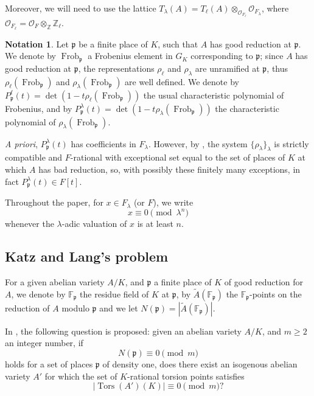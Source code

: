 \documentclass[a4paper,11pt]{amsart}
\theoremstyle{definition}
\newtheorem{notation}[definition]{Notation}
\newcommand{\Z}{\mathbb Z}
\newcommand{\F}{\mathbb F}
\newcommand{\p}{\mathfrak{p}}
\DeclareMathOperator{\Frob}{Frob}
\DeclareMathOperator{\Tors}{Tors}
\begin{document}
Moreover, we will need to use the lattice \(T_\lambda (A)= T_\ell (A) \otimes_{\mathcal{O}_{F_\ell}} \mathcal{O}_{F_\lambda}\), where \( \mathcal{O}_{F_\ell} = \mathcal{O}_F \otimes_\Z \Z_\ell\).

\begin{notation}
    Let \(\p\) be a finite place of \(K\), such that \(A\) has good reduction at \(\p\). We denote by \(\Frob_\p\) a Frobenius element in \(G_K\) corresponding to \(\p\); since \(A\) has good reduction at \(\p\), the representations \(\rho_\ell\) and \(\rho_\lambda\) are unramified at \(\p\), thus \(\rho_\ell(\Frob_\p)\) and \(\rho_\lambda(\Frob_\p)\) are well defined.
    We denote by \(P_\p^\ell(t)=\det(1-t\rho_\ell(\Frob_\p))\) the usual characteristic polynomial of Frobenius, and by \(P_\p^\lambda(t)=\det(1-t\rho_\lambda (\Frob_\p))\) the characteristic polynomial of \(\rho_\lambda(\Frob_\p)\).
\end{notation}

\textit{A priori}, \(P_\p^\lambda(t)\) has coefficients in \(F_\lambda\). However, by \cite[Theorem 2.1.2]{Ribet1976GaloisMultiplications}, the system \(\{\rho_\lambda\}_{\lambda}\) is strictly compatible and \(F\)-rational with exceptional set equal to the set of places of \(K\) at which \(A\) has bad reduction, so, with possibly these finitely many exceptions, in fact \(P_\p^\lambda (t) \in F[t]\).

Throughout the paper, for \(x \in F_\lambda\) (or \(F\)), we write
\[
x \equiv 0 \pmod{\lambda^n}
\]
whenever the \(\lambda\)-adic valuation of \(x\) is at least \(n\).

\subsection{Katz and Lang's problem}\label{sec:Katz}

For a given abelian variety \(A/K\), and \(\p\) a finite place of \(K\) of good reduction for \(A\), we denote by \(\F_\p\) the residue field of \(K\) at \(\p\), by \(\tilde{A}(\F_\p)\) the \(\F_\p\)-points on the reduction of \(A\) modulo \(\p\) and we let \(N(\p) = |\tilde{A}(\F_\p)|\).

In \cite{Katz1981GaloisVarieties}, the following question is proposed: given an abelian variety \(A/K\), and \(m\ge 2\) an integer number, if 
\[
N(\p) \equiv 0 \pmod m
\]
holds for a set of places \(\p\) of density one, does there exist an isogenous abelian variety \(A'\) for which the set of \(K\)-rational torsion points satisfies
\[
|\Tors(A')(K)| \equiv 0 \pmod m ?
\]
\end{document}
